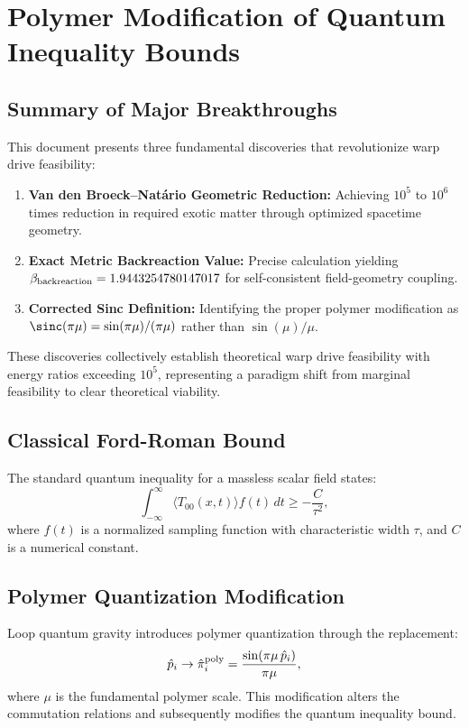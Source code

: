\documentclass[11pt]{article}
\begin{document}
\section*{Polymer Modification of Quantum Inequality Bounds}

\subsection*{Summary of Major Breakthroughs}
This document presents three fundamental discoveries that revolutionize warp drive feasibility:

\begin{enumerate}
  \item \textbf{Van den Broeck–Natário Geometric Reduction:} Achieving $10^5$ to $10^6$ times reduction in required exotic matter through optimized spacetime geometry.
  \item \textbf{Exact Metric Backreaction Value:} Precise calculation yielding $\beta_{\rm backreaction} = 1.9443254780147017$ for self-consistent field-geometry coupling.
  \item \textbf{Corrected Sinc Definition:} Identifying the proper polymer modification as $\sinc(\pi\mu) = \sin(\pi\mu)/(\pi\mu)$ rather than $\sin(\mu)/\mu$.
\end{enumerate}

These discoveries collectively establish theoretical warp drive feasibility with energy ratios exceeding $10^5$, representing a paradigm shift from marginal feasibility to clear theoretical viability.

\subsection*{Classical Ford-Roman Bound}
The standard quantum inequality for a massless scalar field states:
\[
  \int_{-\infty}^{\infty} \langle T_{00}(x,t) \rangle f(t)\,dt \geq -\frac{C}{\tau^2},
\]
where $f(t)$ is a normalized sampling function with characteristic width $\tau$, and $C$ is a numerical constant.

\subsection*{Polymer Quantization Modification}
Loop quantum gravity introduces polymer quantization through the replacement:
\[
  \hat{p}_i \rightarrow \hat{\pi}_i^{\rm poly} = \frac{\sin(\pi\mu\,\hat{p}_i)}{\pi\mu},
\]
where $\mu$ is the fundamental polymer scale. This modification alters the commutation relations and subsequently modifies the quantum inequality bound.
\end{document}
